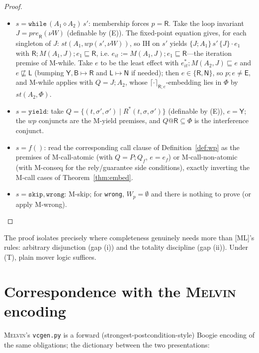 \documentclass[11pt]{article}
\theoremstyle{plain}
\theoremstyle{plain}
\theoremstyle{definition}
\newcommand{\MY}{\mathsf{Y}}
\newcommand{\MB}{\mathsf{B}}
\newcommand{\MR}{\mathsf{R}}
\newcommand{\ML}{\mathsf{L}}
\newcommand{\MN}{\mathsf{N}}
\newcommand{\ME}{\mathsf{E}}
\newcommand{\sq}{\sqsubseteq}
\newcommand{\nsq}{\not\sqsubseteq}
\newcommand{\wpx}{\mathit{wp}}
\newcommand{\stp}{\mathit{st}}
\newcommand{\prep}{\mathit{pre}}
\newcommand{\upemb}[2]{\lceil #1\rceil_{#2}}     %
\newcommand{\tskip}{\mathtt{skip}}
\newcommand{\twrong}{\mathtt{wrong}}
\newcommand{\tyield}{\mathtt{yield}}
\newcommand{\kwhile}{\mathtt{while}}
\newcommand{\cact}[2]{#1\diamond #2}                 %
\newcommand{\melvin}{\textsc{Melvin}}
\newcommand{\code}[1]{\texttt{#1}}
\begin{document}
\begin{proof}
\begin{itemize}[leftmargin=1.4em]
  equalize the two posts to their union.
\item $s=\kwhile\,(\cact{A_1}{A_2})\,s'$: membership forces $p=\MR$. Take the loop
  invariant $J = \prep_{\MR}(\nu W)$ (definable by (E)). The fixed-point equation
  gives, for each singleton of $J$: $\stp(A_1,\wpx(s',\nu W))$, so IH on $s'$
  yields $\{J;A_1\}\,s'\,\{J\}\cdot e_1$ with $\MR;M(A_1,J);e_1\sq\MR$, i.e.
  $e_{\mathit{it}} := M(A_1,J);e_1\sq\MR$---the iteration premise of M-while.
  Take $e$ to be the least effect with $e_{\mathit{it}}^*;M(A_2,J)\sq e$ and
  $e\nsq\ML$ (bumping $\MY,\MB\mapsto\MR$ and $\ML\mapsto\MN$ if needed); then
  $e\in\{\MR,\MN\}$, so $p;e\neq\ME$, and M-while applies with $Q = J;A_2$,
  whose $\upemb{\cdot}{\MR;e}$-embedding lies in $\Phi$ by $\stp(A_2,\Phi)$.
\item $s=\tyield$: take $Q = \{(t,\sigma',\sigma')\mid R^*(t,\sigma,\sigma')\}$
  (definable by (E)), $e=\MY$; the $\wpx$ conjuncts are the M-yield premises, and
  $Q@\MR\subseteq\Phi$ is the interference conjunct.
\item $s=f()$: read the corresponding call clause of Definition~\ref{def:wp} as the
  premises of M-call-atomic (with $Q=P;Q_f$, $e=e_f$) or M-call-non-atomic (with
  M-conseq for the rely/guarantee side conditions), exactly inverting the M-call
  cases of Theorem~\ref{thm:embed}.
\item $s=\tskip,\twrong$: M-skip; for \code{wrong}, $W_p=\emptyset$ and there is
  nothing to prove (or apply M-wrong).\qedhere
\end{itemize}
\end{proof}

The proof isolates precisely where completeness genuinely needs more than [ML]'s
rules: arbitrary disjunction (gap (i)) and the totality discipline (gap (ii)).
Under (T), plain mover logic suffices.

\section{Correspondence with the \melvin{} encoding}\label{sec:melvin}

\melvin{}'s \code{vcgen.py} is a forward (strongest-postcondition-style) Boogie
encoding of the same obligations; the dictionary between the two presentations:
\end{document}
